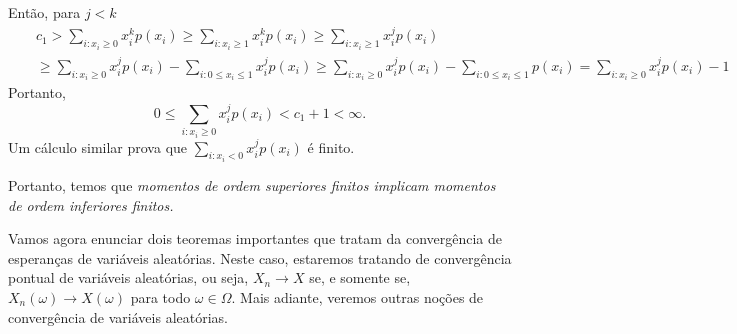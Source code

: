 \begin{frame}
\begin{block}{}
	Então, para $j<k$
\begin{eqnarray}
& & c_1>\sum_{i:x_i\geq 0}x_i^kp(x_i)\geq \sum_{i:x_i\geq
1}x_i^kp(x_i)\geq \sum_{i:x_i\geq 1}x_i^jp(x_i)\nonumber\\
& & \geq \sum_{i:x_i\geq 0}x_i^jp(x_i)-\sum_{i:0\leq x_i\leq
1}x_i^jp(x_i)\geq \sum_{i:x_i\geq 0}x_i^jp(x_i)-\sum_{i:0\leq
x_i\leq 1}p(x_i)=\sum_{i:x_i\geq 0}x_i^jp(x_i)-1\nonumber
\end{eqnarray}
Portanto,
$$0\leq \sum_{i:x_i\geq 0}x_i^jp(x_i)<c_1+1<\infty.$$
Um cálculo similar prova que $\sum_{i:x_i< 0}x_i^jp(x_i)$ é finito.
\end{block}
%
Portanto, temos que {\em momentos de ordem superiores finitos
implicam momentos de ordem inferiores finitos.}
%

Vamos agora enunciar dois teoremas importantes que tratam
da convergência de esperanças de variáveis aleatórias. Neste caso, estaremos tratando de convergência pontual de variáveis aleatórias, ou seja, $X_n\rightarrow X$ se, e somente se, $X_n(\omega)\rightarrow X(\omega)$ para todo $\omega\in \Omega$. Mais adiante, veremos outras noções de convergência de variáveis aleatórias.
\end{frame}
%
